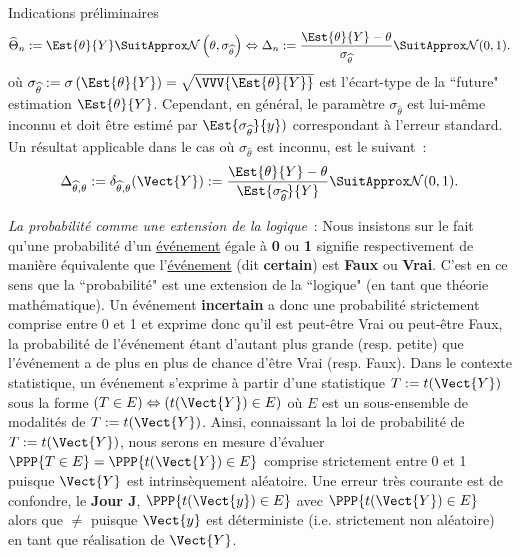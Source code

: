 \documentclass[10pt]{report}
\begin{document}
\begin{IndicList}{Indications préliminaires}
\[
 \widehat{\Theta}_n:=\Est{\theta}{Y}\SuitApprox \mathcal{N}\left(\theta,\sigma_{\widehat{\theta}}\right) \Leftrightarrow \Delta_n:=\frac{\Est{\theta}{Y} -\theta }{\sigma_{\widehat{\theta}} } \SuitApprox \mathcal{N}(0,1).
\]
où $\sigma_{\widehat{\theta}}:=\sigma\left(\Est{\theta}{Y}\right)=\sqrt{\VVV{\Est{\theta}{Y}}}$ est l'écart-type de la ``future" estimation  $\Est{\theta}{Y}$. Cependant, en général, le paramètre $\sigma_{\widehat{\theta}}$ est lui-même inconnu et doit être estimé par $\Est{\sigma_{\widehat{\theta}}}{y})$ correspondant à  l'erreur standard. Un résultat applicable dans le cas où $\sigma_{\widehat{\theta}}$ est inconnu, est le suivant~:
\[
  \Delta_{\widehat{\theta},\theta}:=\delta_{\widehat{\theta},\theta}(\Vect{Y}):=\frac{\Est{\theta}{Y} -\theta }{\Est{\sigma_{\widehat{\theta}}}{Y} } \SuitApprox \mathcal{N}(0,1).
\]

\item \textit{La probabilité comme une extension de la logique}~: Nous insistons sur le fait qu'une probabilité d'un \underline{événement} égale à \textbf{0} ou \textbf{1} signifie respectivement de manière équivalente que l'\underline{événement} (dit \textbf{certain}) est \textbf{Faux} ou \textbf{Vrai}.
C'est en ce sens que la ``probabilité" est une extension de la ``logique" (en tant que théorie mathématique). Un événement \textbf{incertain} a donc une probabilité strictement comprise entre 0 et 1 et exprime donc qu'il est peut-être Vrai ou peut-être Faux, la probabilité de l'événement étant d'autant plus grande (resp. petite) que l'événement a de plus en plus de chance d'être Vrai (resp. Faux). Dans le contexte statistique, un événement s'exprime à partir d'une statistique $T:=t(\Vect{Y})$ sous la forme  $\left(T\in E\right)\Leftrightarrow\left(t(\Vect{Y})\in E\right)$ où $E$ est un sous-ensemble de modalités de $T:=t(\Vect{Y})$. Ainsi, connaissant la loi de probabilité de $T:=t(\Vect{Y})$, nous serons en mesure d'évaluer $\PPP{T\in E}=\PPP{t(\Vect{Y})\in E}$ comprise strictement entre 0 et 1 puisque $\Vect{Y}$ est intrinsèquement aléatoire. Une erreur très courante est de confondre, le \textbf{Jour J}, $\PPP{t(\Vect{y})\in E}$ avec $\PPP{t(\Vect{Y})\in E}$ alors que  $\neq$\fbox{$\PPP{t(\Vect{Y})\in E}\in]0,1[$} puisque $\Vect{y}$ est déterministe (i.e. strictement non aléatoire) en tant que réalisation de $\Vect{Y}$.
\end{IndicList}
\end{document}

